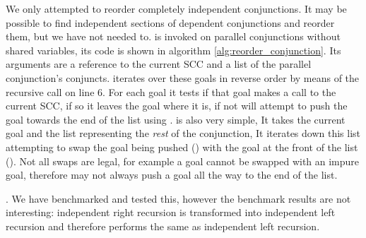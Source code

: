 We only attempted to reorder completely independent conjunctions.
It may be possible to find independent sections of dependent conjunctions
and reorder them,
but we have not needed to.
\reorder is invoked on parallel conjunctions without shared variables,
its code is shown in algorithm \ref{alg:reorder_conjunction}.
Its arguments are a reference to the current SCC and a list of the parallel
conjunction's conjuncts.
\reorder iterates over these goals in reverse order by means of the
recursive call on line 6.
For each goal it tests if that goal makes a call to the current SCC,
if so it leaves the goal where it is,
if not \reorder will attempt to push the goal towards the end of the
list using \trypushconjlater.
\trypushconjlater is also very simple,
It takes the current goal and the list representing the \emph{rest} of the
conjunction,
It iterates down this list attempting to swap the goal being pushed
() with the goal at the front of the list ().
Not all swaps are legal,
for example a goal cannot be swapped with an impure goal,
therefore \trypushconjlater may not always push a goal all the way to the
end of the list.

.
We have benchmarked and tested this,
however the benchmark results are not interesting:
independent right recursion is transformed into independent left
recursion and therefore performs the same as independent left recursion.

